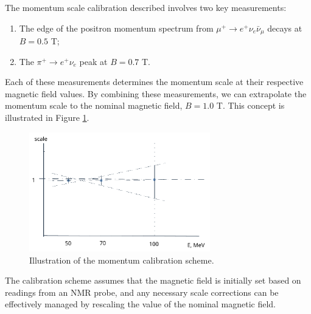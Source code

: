 The momentum scale calibration described involves two key measurements: 
\begin{enumerate}
    \item The edge of the positron momentum spectrum from $\mu^+ \rightarrow e^+ \nu_e \bar{\nu}_\mu$ decays at $B = 0.5$ T;
    \item The $\pi^+ \rightarrow e^+ \nu_e$ peak at $B = 0.7$ T.
\end{enumerate}

Each of these measurements determines the momentum scale at their respective 
magnetic field values. By combining these measurements, we can extrapolate the 
momentum scale to the nominal magnetic field, $B = 1.0$ T. This concept is illustrated in Figure \ref{fig:momscale}.

\begin{figure}[h]
\centering
\includegraphics[width=0.7\textwidth]{figures/png/Screenshot_20240707_180742.png}
\caption[The momentum calibration scheme.]{Illustration of the momentum calibration scheme.}
\label{fig:momscale}
\end{figure}

The calibration scheme assumes that the magnetic field is initially set based 
on readings from an NMR probe, and any necessary scale corrections can be 
effectively managed by rescaling the value of the nominal magnetic field.

